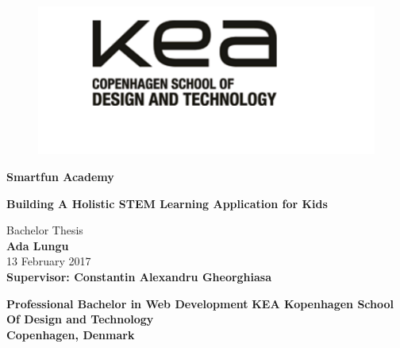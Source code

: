\documentclass{report}
\begin{document}
\begin{titlepage}
        \begin{figure}
		\includegraphics[width=0.5\linewidth]{images/kea.png}
		\end{figure}
    \begin{center}

        \Huge
        \textbf{Smartfun Academy}
        \vspace{0.5cm}

        \LARGE
        \textbf{Building A Holistic STEM Learning Application for Kids}\\
        \vspace{0.5cm}

        \Large
        Bachelor Thesis\\
        \vspace{1.5cm}
        \textbf{Ada Lungu}\\
        \vspace{0.2cm}
        13 February 2017\\

        \vspace{2.5cm}
        \textbf{Supervisor: Constantin Alexandru Gheorghiasa}\\
        \vspace{1.5cm}
        
        \Large
        \textbf{Professional Bachelor in Web Development}
        \vspace{0.4cm}
        \textbf{ KEA Kopenhagen School Of Design and Technology}\\
        \vspace{0.4cm}
        \textbf{Copenhagen, Denmark}
        
        
    \end{center}
\end{titlepage}

\tableofcontents




\end{document}
